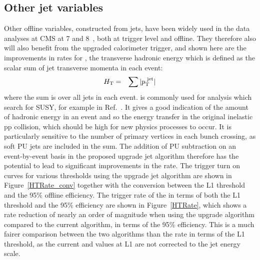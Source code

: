 \subsection{Other jet variables}
Other offline variables, constructed from jets, have been widely used in the data analyses at \ac{CMS} at 7 and 8~\TeV, both at trigger level and offline.
They therefore also will also benefit from the upgraded calorimeter trigger, and shown here are the improvements in rates for \HT, the transverse hadronic energy which is defined as the scalar sum of jet transverse momenta in each event:
%
\begin{eqnarray}
\HT &=& \sum{|\pt^{\text{ jet}}|} %
\end{eqnarray}  
where the sum is over all jets in each event.
\HT is commonly used for analysis which search for \ac{SUSY}, for example in Ref.~\cite{alphaT}.
It gives a good indication of the amount of hadronic energy in an event and so the energy transfer in the original inelastic pp collision, which should be high for new physics processes to occur.
It is particularly sensitive to the number of primary vertices in each bunch crossing, as soft \ac{PU} jets are included in the sum.
The addition of \ac{PU} subtraction on an event-by-event basis in the proposed upgrade jet algorithm therefore has the potential to lead to significant improvements in the rate.
The trigger turn on curves for various \HT thresholds using the upgrade jet algorithm are shown in Figure~\ref{HTRate_conv} together with the conversion between the \ac{L1} threshold and the 95\% offline efficiency. 
The trigger rate of the \HT in terms of both the \ac{L1} threshold and the 95\% efficiency are shown in Figure~\ref{HTRate}, which shows a rate reduction of nearly an order of magnitude when using the upgrade algorithm compared to the current algorithm, in terms of the 95\% efficiency. 
This is a much fairer comparison between the two algorithms than the rate in terms of the \ac{L1} threshold, as the current \HT and \MHT values at \ac{L1} are not corrected to the jet energy scale.


